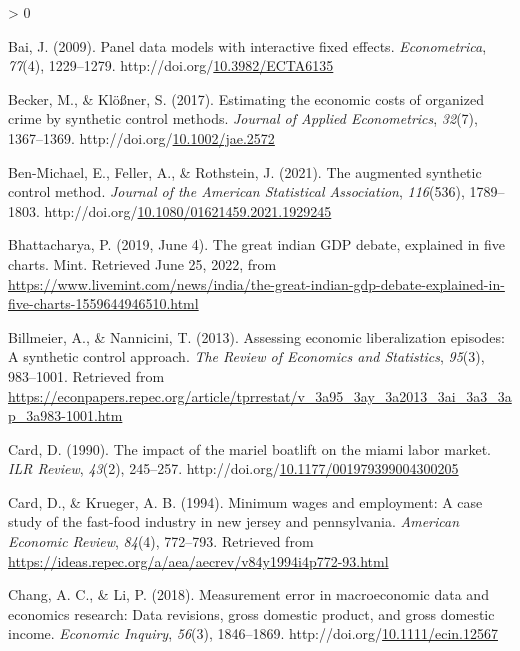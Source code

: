 \documentclass[12pt,nobind, a4paper]{reedthesis}
\newlength{\cslhangindent}
\newenvironment{CSLReferences}[2] %
{%
	\setlength{\parindent}{0pt}
	\ifodd #1 \everypar{\setlength{\hangindent}{\cslhangindent}}\ignorespaces\fi
	\ifnum #2 > 0
	\setlength{\parskip}{#2\baselineskip}
	\fi
}%
{}
\begin{document}
\begin{CSLReferences}{1}{0}
 \leavevmode\hypertarget{ref-bai_panel_2009}{}%
 Bai, J. (2009). Panel data models with interactive fixed effects. \emph{Econometrica}, \emph{77}(4), 1229--1279. http://doi.org/\href{https://doi.org/10.3982/ECTA6135}{10.3982/ECTA6135}

 \leavevmode\hypertarget{ref-becker_estimating_2017}{}%
 Becker, M., \& Klößner, S. (2017). Estimating the economic costs of organized crime by synthetic control methods. \emph{Journal of Applied Econometrics}, \emph{32}(7), 1367--1369. http://doi.org/\href{https://doi.org/10.1002/jae.2572}{10.1002/jae.2572}

 \leavevmode\hypertarget{ref-ben-michael_augmented_2021}{}%
 Ben-Michael, E., Feller, A., \& Rothstein, J. (2021). The augmented synthetic control method. \emph{Journal of the American Statistical Association}, \emph{116}(536), 1789--1803. http://doi.org/\href{https://doi.org/10.1080/01621459.2021.1929245}{10.1080/01621459.2021.1929245}

 \leavevmode\hypertarget{ref-bhattacharya_great_2019}{}%
 Bhattacharya, P. (2019, June 4). The great indian {GDP} debate, explained in five charts. Mint. Retrieved June 25, 2022, from \url{https://www.livemint.com/news/india/the-great-indian-gdp-debate-explained-in-five-charts-1559644946510.html}

 \leavevmode\hypertarget{ref-billmeier_assessing_2013}{}%
 Billmeier, A., \& Nannicini, T. (2013). Assessing economic liberalization episodes: A synthetic control approach. \emph{The Review of Economics and Statistics}, \emph{95}(3), 983--1001. Retrieved from \url{https://econpapers.repec.org/article/tprrestat/v_3a95_3ay_3a2013_3ai_3a3_3ap_3a983-1001.htm}

 \leavevmode\hypertarget{ref-card_impact_1990}{}%
 Card, D. (1990). The impact of the mariel boatlift on the miami labor market. \emph{{ILR} Review}, \emph{43}(2), 245--257. http://doi.org/\href{https://doi.org/10.1177/001979399004300205}{10.1177/001979399004300205}

 \leavevmode\hypertarget{ref-card_minimum_1994}{}%
 Card, D., \& Krueger, A. B. (1994). Minimum wages and employment: A case study of the fast-food industry in new jersey and pennsylvania. \emph{American Economic Review}, \emph{84}(4), 772--793. Retrieved from \url{https://ideas.repec.org/a/aea/aecrev/v84y1994i4p772-93.html}

 \leavevmode\hypertarget{ref-chang_measurement_2018}{}%
 Chang, A. C., \& Li, P. (2018). Measurement error in macroeconomic data and economics research: Data revisions, gross domestic product, and gross domestic income. \emph{Economic Inquiry}, \emph{56}(3), 1846--1869. http://doi.org/\href{https://doi.org/10.1111/ecin.12567}{10.1111/ecin.12567}


\end{CSLReferences}
\end{document}
